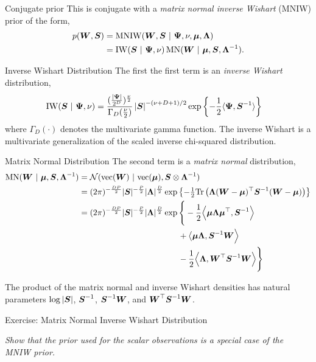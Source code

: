 \documentclass[aspectratio=169]{beamer}
\begin{document}
\begin{frame}{Conjugate prior}
This is conjugate with a \emph{matrix normal inverse Wishart} (MNIW) prior of the form,
\begin{align}
p(\boldsymbol{W}, \boldsymbol{S}) &= \mathrm{MNIW}(\boldsymbol{W}, \boldsymbol{S} ~\vert~ \boldsymbol{\Psi}, \nu, \boldsymbol{\mu}, \boldsymbol{\Lambda}) \\
&= \mathrm{IW}(\boldsymbol{S} ~\vert~ \boldsymbol{\Psi}, \nu) \, 
\mathrm{MN}(\boldsymbol{W} ~\vert~ \boldsymbol{\mu}, \boldsymbol{S}, \boldsymbol{\Lambda}^{-1}).
\end{align}
\end{frame}

\begin{frame}{Inverse Wishart Distribution}
The first the first term is an \emph{inverse Wishart} distribution,
\begin{align}
    \mathrm{IW}(\boldsymbol{S} ~\vert~ \boldsymbol{\Psi}, \nu) &= \frac{(\frac{|\boldsymbol{\Psi}|}{2^D})^{\frac{\nu}{2}}}{\Gamma_D(\frac{\nu}{2})}
    \left|\boldsymbol{S} \right|^{-(\nu +D+1)/2} \exp \left\{-\frac{1}{2} \langle \boldsymbol{\Psi}, \boldsymbol{S}^{-1} \rangle \right\}
\end{align}
where $\Gamma_D(\cdot)$ denotes the multivariate gamma function. The inverse Wishart is a multivariate generalization of the scaled inverse chi-squared distribution.
\end{frame}

\begin{frame}{Matrix Normal Distribution}
The second term is a \emph{matrix normal} distribution,
\begin{align}
    \mathrm{MN}(\mbW \mid \mbmu, \mbS, \mbLambda^{-1})
    &= \cN(\mathrm{vec}(\mbW) \mid \mathrm{vec}(\mbmu), \mbS \otimes \mbLambda^{-1}) \\
    &= (2\pi)^{-\frac{DP}{2}} |\mbS |^{-\frac{P}{2}} |\mbLambda|^{\frac{D}{2}} 
    \exp \left\{ -\tfrac{1}{2} \Tr\left( \mbLambda (\mbW - \mbmu)^\top \mbS^{-1} (\mbW - \mbmu) 
    \right) \right\} \\
    \nonumber
    &= (2\pi)^{-\frac{DP}{2}} |\mbS |^{-\frac{P}{2}} |\mbLambda|^{\frac{D}{2}} 
    \exp \Bigg\{ 
    -\frac{1}{2} \Big \langle \mbmu \mbLambda \mbmu^\top, \mbS^{-1} \Big \rangle
    \\
    \nonumber
    &\hspace{12em}
    + \big \langle \mbmu \mbLambda, \mbS^{-1} \mbW \Big \rangle 
    \\
    &\hspace{12em}
    -\frac{1}{2} \Big\langle \mbLambda,  \mbW^\top \mbS^{-1} \mbW \Big \rangle
    \Bigg\}
\end{align}

The product of the matrix normal and inverse Wishart densities has natural parameters $\log |\boldsymbol{S}|$, $\boldsymbol{S}^{-1}$, $\boldsymbol{S}^{-1} \boldsymbol{W}$, and $\boldsymbol{W}^\top \boldsymbol{S}^{-1} \boldsymbol{W}$.

\end{frame}

\begin{frame}[t]{Exercise: Matrix Normal Inverse Wishart Distribution}

\textit{Show that the prior used for the scalar observations is a special case of the MNIW prior.}

\end{frame}
\end{document}
